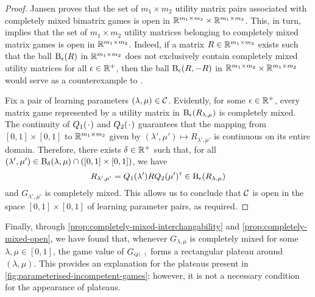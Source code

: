     \begin{proof}
        Jansen \parencite[Theorem 3.15]{Jansen1981} proves that the set of $m_1 \times m_2$ utility matrix pairs associated with completely mixed bimatrix games is open in $\mathbb{R}^{m_1 \times m_2} \times \mathbb{R}^{m_1 \times m_2}$.
        This, in turn, implies that the set of $m_1 \times m_2$ utility matrices belonging to completely mixed matrix games is open in $\mathbb{R}^{m_1 \times m_2}$.
        Indeed, if a matrix $R \in \mathbb{R}^{m_1 \times m_2}$ exists such that the ball $\mathrm{B}_{\epsilon}(R)$ in $\mathbb{R}^{m_1 \times m_2}$ does not exclusively contain completely mixed utility matrices for all $\epsilon \in \mathbb{R}^+$, then the ball $\mathrm{B}_{\epsilon}(R, -R)$ in $\mathbb{R}^{m_1 \times m_2} \times \mathbb{R}^{m_1 \times m_2}$ would serve as a counterexample to \parencite[Theorem 3.15]{Jansen1981}.

        Fix a pair of learning parameters $(\lambda, \mu) \in \mathcal{C}$.
        Evidently, for some $\epsilon \in \mathbb{R}^+$, every matrix game represented by a utility matrix in $\mathrm{B}_{\epsilon}(R_{\lambda, \mu})$ is completely mixed.
        The continuity of $Q_1(\funcdot)$ and $Q_2(\funcdot)$ guarantees that the mapping from $[0, 1] \times [0, 1]$ to $\mathbb{R}^{m_1 \times m_2}$ given by $(\lambda', \mu') \mapsto R_{\lambda', \mu'}$ is continuous on its entire domain.
        Therefore, there exists $\delta \in \mathbb{R}^+$ such that, for all $(\lambda', \mu') \in \mathrm{B}_{\delta}(\lambda, \mu) \cap ([0, 1] \times [0, 1])$, we have
        \begin{equation} \label{temp:completely-mixed-open-1}
            R_{\lambda', \mu'}
                = Q_1(\lambda') R Q_2(\mu')^{\scriptscriptstyle \mathsf{T}}
                \in \mathrm{B}_{\epsilon}(R_{\lambda, \mu})
        \end{equation}
        and $G_{\lambda', \mu'}$ is completely mixed.
        This allows us to conclude that $\mathcal{C}$ is open in the space $[0, 1] \times [0, 1]$ of learning parameter pairs, as required.
    \end{proof}

    Finally, through \autoref{prop:completely-mixed-interchangability} and \autoref{prop:completely-mixed-open}, we have found that, whenever $G_{\lambda, \mu}$ is completely mixed for some $\lambda, \mu \in [0, 1]$, the game value of $G_\ms{Q(\funcdot)}$ forms a rectangular plateau around $(\lambda, \mu)$.
    This provides an explanation for the plateaus present in \autoref{fig:parameterised-incompetent-games}; however, it is not a necessary condition for the appearance of plateaus.

